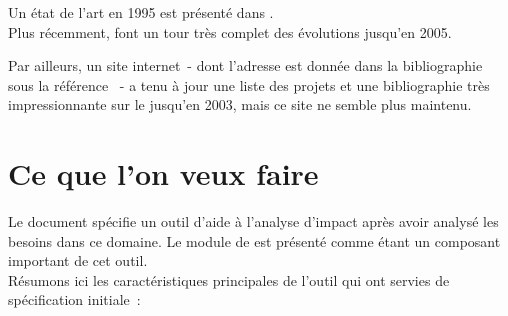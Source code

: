 Un état de l'art en 1995 est présenté dans \cite{tip95survey}.\\
Plus récemment, \cite{survey2005} font un tour très complet des évolutions
jusqu'en 2005.

Par ailleurs, un site internet~- dont l'adresse est donnée
dans la bibliographie sous la référence \cite{wwwSlicing}~-
a tenu à jour une liste des projets
et une bibliographie très impressionnante sur le \slicing
jusqu'en 2003, mais ce site ne semble plus maintenu.\\


\section{Ce que l'on veux faire}\label{sec-but}\label{sec-defR}

\newcommand{\remitem}[1]{\begin{itemize}\item #1 \end{itemize}}

Le document \cite{baudinImpact} spécifie un outil d'aide à l'analyse d'impact
après avoir analysé les besoins dans ce domaine.
Le module de \slicing est présenté comme étant
un composant important de cet outil.\\

Résumons ici les caractéristiques principales de l'outil
qui ont servies de spécification initiale~:

